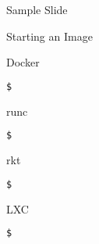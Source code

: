 \begin{frame}[fragile]{Sample Slide}



\end{frame}



\begin{frame}[fragile]{Starting an Image}

\begin{block}{Docker}
\begin{lstlisting}[language=bash,keywordstyle=\bf,stringstyle=\it,basicstyle=\tiny]
$
\end{lstlisting}
\end{block}

\begin{block}{runc}
\begin{lstlisting}[language=bash,keywordstyle=\bf,stringstyle=\it,basicstyle=\tiny]
$ 
\end{lstlisting}
\end{block}



\begin{block}{rkt}
\begin{lstlisting}[language=bash,keywordstyle=\bf,stringstyle=\it,basicstyle=\tiny]
$ 
\end{lstlisting}
\end{block}

\begin{block}{LXC}
\begin{lstlisting}[language=bash,keywordstyle=\bf,stringstyle=\it,basicstyle=\tiny]
$ 
\end{lstlisting}
\end{block}

\end{frame}